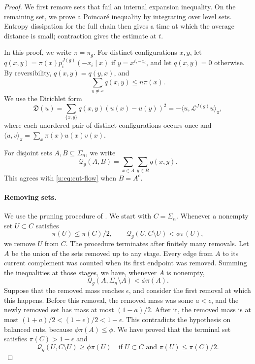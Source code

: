 \begin{proof}
We first remove sets that fail an internal expansion inequality. On the
remaining set, we prove a Poincar\'e inequality by integrating over level
sets. Entropy dissipation for the full chain then gives a time at which
the average distance is small; contraction gives the estimate at $t$.

In this proof, we write $\pi=\pi_g$. For distinct configurations $x,y$,
let $q(x,y)=\pi(x)p_i^{J(g)}(-x_i\mid x)$ if $y=x^{i,-x_i}$, and let
$q(x,y)=0$ otherwise. By reversibility, $q(x,y)=q(y,x)$, and
\[
 \sum_{y\ne x}q(x,y)\le n\pi(x).
\]
We use the Dirichlet form
\begin{equation}\label{u:eq:pruning-dirichlet}
 \mathfrak D(u)=\sum_{\{x,y\}}q(x,y)(u(x)-u(y))^2
              =-\langle u,\mathcal L^{J(g)}u\rangle_\pi,
\end{equation}
where each unordered pair of distinct configurations occurs once and
$\langle u,v\rangle_\pi=\sum_x\pi(x)u(x)v(x)$.

For disjoint sets $A,B\subseteq\Sigma_n$, we write
\[
 \mathcal Q_g(A,B)=\sum_{x\in A}\sum_{y\in B}q(x,y).
\]
This agrees with \eqref{u:eq:cut-flow} when $B=A^c$.

\paragraph{Removing sets.}
We use the pruning procedure of
\cite[Section~7, proof of Lemma~8]{oai-typical-upper}.
We start with $C=\Sigma_n$. Whenever a nonempty set $U\subset C$ satisfies
\[
 \pi(U)\le\pi(C)/2,
 \qquad \mathcal Q_g(U,C\setminus U)<\phi\pi(U),
\]
we remove $U$ from $C$. The procedure terminates after finitely many
removals. Let $A$ be the union of the sets removed up to any
stage. Every edge from $A$ to its current complement was counted when
its first endpoint was removed. Summing the inequalities at those
stages, we have, whenever $A$ is nonempty,
\[
 \mathcal Q_g(A,\Sigma_n\setminus A)<\phi\pi(A).
\]
Suppose that the removed mass reaches $\epsilon$, and consider the first
removal at which this happens. Before this removal, the removed mass
was some $a<\epsilon$, and the newly removed set has mass at most
$(1-a)/2$. After it, the removed mass is at most
$(1+a)/2<(1+\epsilon)/2<1-\epsilon$. This contradicts the hypothesis on balanced
cuts, because $\phi\pi(A)\le\phi$. We have proved that
the terminal set satisfies $\pi(C)>1-\epsilon$ and
\begin{equation}\label{u:eq:internal-expansion}
 \mathcal Q_g(U,C\setminus U)\ge\phi\pi(U)
 \quad\text{if }U\subset C\text{ and }\pi(U)\le\pi(C)/2.
\end{equation}


\end{proof}

